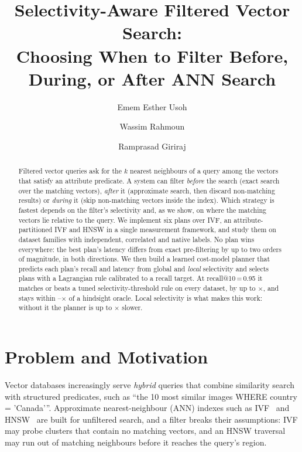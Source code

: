 \documentclass[sigconf,nonacm]{acmart}
\begin{document}
\title{Selectivity-Aware Filtered Vector Search:\\Choosing When to Filter Before, During, or After ANN Search}

\author{Emem Esther Usoh}
\author{Wassim Rahmoun}
\author{Ramprasad Giriraj}

\begin{abstract}
Filtered vector queries ask for the $k$ nearest neighbours of a query among the vectors that satisfy an attribute predicate. A system can filter \emph{before} the search (exact search over the matching vectors), \emph{after} it (approximate search, then discard non-matching results) or \emph{during} it (skip non-matching vectors inside the index). Which strategy is fastest depends on the filter's selectivity and, as we show, on where the matching vectors lie relative to the query. We implement six plans over IVF, an attribute-partitioned IVF and HNSW in a single measurement framework, and study them on \nDatasets{} dataset families with independent, correlated and native labels. No plan wins everywhere: the best plan's latency differs from exact pre-filtering by up to two orders of magnitude, in both directions. We then build a learned cost-model planner that predicts each plan's recall and latency from global and \emph{local} selectivity and selects plans with a Lagrangian rule calibrated to a recall target. At recall@10\,=\,0.95 it matches or beats a tuned selectivity-threshold rule on every dataset, by up to \mrSpeedupMax$\times$, and stays within \mrOracleGapMin--\mrOracleGapMax$\times$ of a hindsight oracle. Local selectivity is what makes this work: without it the planner is up to \mrSiftGlobalSlowdown$\times$ slower.
\end{abstract}

\maketitle

\section{Problem and Motivation}

Vector databases increasingly serve \emph{hybrid} queries that combine similarity search with structured predicates, such as ``the 10 most similar images \textsf{WHERE} \textsf{country = 'Canada'}''. Approximate nearest-neighbour (ANN) indexes such as IVF~\cite{jegou2011pq} and HNSW~\cite{malkov2020hnsw} are built for unfiltered search, and a filter breaks their assumptions: IVF may probe clusters that contain no matching vectors, and an HNSW traversal may run out of matching neighbours before it reaches the query's region.
\end{document}
